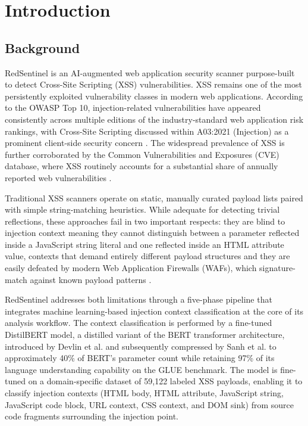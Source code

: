 \chapter{Introduction}
\section{Background}
RedSentinel is an AI-augmented web application security scanner purpose-built to detect Cross-Site Scripting (XSS) vulnerabilities. XSS remains one of the most persistently exploited vulnerability classes in modern web applications. According to the OWASP Top 10, injection-related vulnerabilities have appeared consistently across multiple editions of the industry-standard web application risk rankings, with Cross-Site Scripting discussed within A03:2021 (Injection) as a prominent client-side security concern \cite{owasp_top10_2021}. The widespread prevalence of XSS is further corroborated by the Common Vulnerabilities and Exposures (CVE) database, where XSS routinely accounts for a substantial share of annually reported web vulnerabilities \cite{mitre_cve}.

Traditional XSS scanners operate on static, manually curated payload lists paired with simple string-matching heuristics. While adequate for detecting trivial reflections, these approaches fail in two important respects: they are blind to injection context meaning they cannot distinguish between a parameter reflected inside a JavaScript string literal and one reflected inside an HTML attribute value, contexts that demand entirely different payload structures and they are easily defeated by modern Web Application Firewalls (WAFs), which signature-match against known payload patterns \cite{bau2010state}.

RedSentinel addresses both limitations through a five-phase pipeline that integrates machine learning-based injection context classification at the core of its analysis workflow. The context classification is performed by a fine-tuned DistilBERT model, a distilled variant of the BERT transformer architecture, introduced by Devlin et al.\cite{devlin2019bert} and subsequently compressed by Sanh et al.\cite{sanh2019distilbert} to approximately 40\% of BERT's parameter count while retaining 97\% of its language understanding capability on the GLUE benchmark. The model is fine-tuned on a domain-specific dataset of 59,122 labeled XSS payloads, enabling it to classify injection contexts (HTML body, HTML attribute, JavaScript string, JavaScript code block, URL context, CSS context, and DOM sink) from source code fragments surrounding the injection point.

